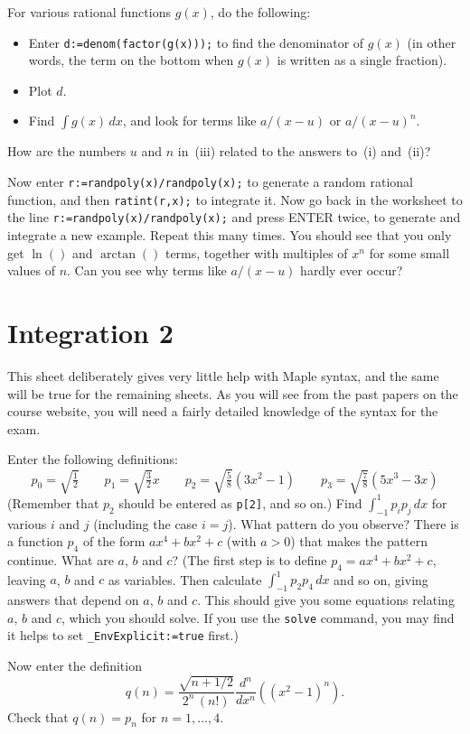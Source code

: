 \documentclass[a4paper,10pt]{amsbook}
\begin{document}
\begin{exercise}
 For various rational functions $g(x)$, do the following:
 \begin{itemize}
  \item[(i)] Enter \verb~d:=denom(factor(g(x)));~ to find
   the denominator of $g(x)$ (in other words, the term on
   the bottom when $g(x)$ is written as a single fraction).
  \item[(ii)] Plot $d$.
  \item[(iii)] Find $\int g(x)\,dx$, and look for terms like
   $a/(x-u)$ or $a/(x-u)^n$. 
 \end{itemize}
 How are the numbers $u$ and $n$ in~(iii) related to the
 answers to~(i) and~(ii)?
 
 Now enter \verb~r:=randpoly(x)/randpoly(x);~ to generate a
 random rational function, and then \verb~ratint(r,x);~ to
 integrate it.  Now go back in the worksheet to the line
 \verb~r:=randpoly(x)/randpoly(x);~ and press ENTER twice,
 to generate and integrate a new example.  Repeat this many
 times.  You should see that you only get $\ln()$ and
 $\arctan()$ terms, together with multiples of $x^n$ for
 some small values of $n$.  Can you see why terms like
 $a/(x-u)$ hardly ever occur?
\end{exercise}


\chapter{Integration 2}

This sheet deliberately gives very little help with Maple syntax, and
the same will be true for the remaining sheets.  As you will see from
the past papers on the course website, you will need a fairly detailed
knowledge of the syntax for the exam.

\begin{exercise}\label{ex-legendre}
 Enter the following definitions:
 \[
  p_0 = \sqrt{\tfrac{1}{2}}            \hspace{2em}
  p_1 = \sqrt{\tfrac{3}{2}} x          \hspace{2em}
  p_2 = \sqrt{\tfrac{5}{8}}(3x^2 - 1)  \hspace{2em}
  p_3 = \sqrt{\tfrac{7}{8}}(5x^3 - 3x)
 \]
 (Remember that $p_2$ should be entered as
 \verb~p[2]~, and so on.)  Find
 $\int_{-1}^1p_ip_j\,dx$ for various $i$ and $j$
 (including the case $i=j$).  What pattern do you observe?
 There is a function $p_4$ of the form $ax^4+bx^2+c$
 (with $a>0$) that makes the pattern continue.  What are
 $a$, $b$ and $c$?  (The first step is to define
 $p_4=ax^4+bx^2+c$, leaving $a$, $b$ and $c$ as
 variables.  Then calculate $\int_{-1}^1p_2p_4\, dx$
 and so on, giving answers that depend on $a$, $b$ and $c$.
 This should give you some equations relating $a$, $b$ and
 $c$, which you should solve.  If you use the \verb~solve~
 command, you may find it helps to set
 \verb~_EnvExplicit:=true~ first.)

 Now enter the definition
 \[ q(n) =
     \frac{\sqrt{n+1/2}}{2^n\,(n!)}
      \frac{d^n}{dx^n}\left((x^2-1)^n\right).
 \]
 Check that $q(n)=p_n$ for $n=1,\ldots,4$.
\end{exercise}
\end{document}
